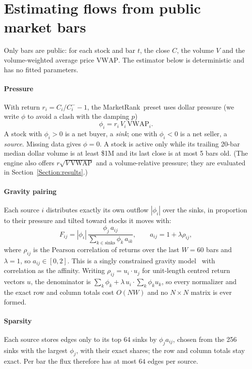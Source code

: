 \documentclass[preprint,3p,twocolumn]{elsarticle}
\newcommand{\MR}{MarketRank}
\begin{document}
\section{Estimating flows from public market bars}
\label{Section:flows}

Only bars are public: for each stock and bar $t$, the close $C$, the volume $V$ and the volume-weighted average price $\mathrm{VWAP}$. The estimator below is deterministic and has no fitted parameters.

\paragraph{Pressure} With return $r_i=C_i/C_i^{-}-1$, the \MR\ preset uses dollar pressure (we write $\phi$ to avoid a clash with the damping $p$)
\begin{equation}
\phi_i=r_i\,V_i\,\mathrm{VWAP}_i .
\end{equation}
A stock with $\phi_i>0$ is a net buyer, a \emph{sink}; one with $\phi_i<0$ is a net seller, a \emph{source}. Missing data gives $\phi=0$. A stock is active only while its trailing 20-bar median dollar volume is at least \$1M and its last close is at most 5 bars old. (The engine also offers $r\sqrt{V\,\mathrm{VWAP}}$ and a volume-relative pressure; they are evaluated in Section~\ref{Section:results}.)

\paragraph{Gravity pairing} Each source $i$ distributes exactly its own outflow $|\phi_i|$ over the sinks, in proportion to their pressure and tilted toward stocks it moves with:
\begin{equation}
F_{ij}=|\phi_i|\,\frac{\phi_j\,a_{ij}}{\sum_{k\in\mathrm{sinks}}\phi_k\,a_{ik}},\qquad a_{ij}=1+\lambda\rho_{ij},
\label{eqn:gravity}
\end{equation}
where $\rho_{ij}$ is the Pearson correlation of returns over the last $W=60$ bars and $\lambda=1$, so $a_{ij}\in[0,2]$. This is a singly constrained gravity model~\cite{wilson} with correlation as the affinity. Writing $\rho_{ij}=u_i\cdot u_j$ for unit-length centred return vectors $u$, the denominator is $\sum_k\phi_k+\lambda\,u_i\cdot\sum_k\phi_k u_k$, so every normalizer and the exact row and column totals cost $O(NW)$ and no $N\times N$ matrix is ever formed.

\paragraph{Sparsity} Each source stores edges only to its top 64 sinks by $\phi_j a_{ij}$, chosen from the 256 sinks with the largest $\phi_j$, with their exact shares; the row and column totals stay exact. Per bar the flux therefore has at most $64$ edges per source.
\end{document}
